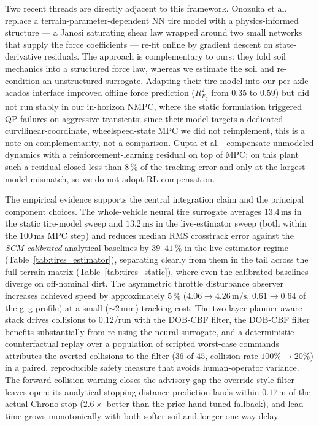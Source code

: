 \documentclass[conference,letterpaper,10pt]{IEEEtran}
\begin{document}
Two recent threads are directly adjacent to this framework.
Onozuka et al.~\cite{Onozuka25} replace a terrain-parameter-dependent NN
tire model with a physics-informed structure --- a Janosi saturating
shear law wrapped around two small networks that supply the force
coefficients --- re-fit online by gradient descent on state-derivative
residuals. The approach is complementary to ours: they fold soil
mechanics into a structured force law, whereas we estimate the soil and
re-condition an unstructured surrogate. Adapting their tire model into
our per-axle acados interface improved offline force prediction
($R^2_{F_y}$ from $0.35$ to $0.59$) but did not run stably in our
in-horizon NMPC, where the static formulation triggered QP failures on
aggressive transients; since their model targets a dedicated
curvilinear-coordinate, wheelspeed-state MPC we did not reimplement, this
is a note on complementarity, not a comparison. Gupta
et al.~\cite{Gupta24} compensate unmodeled dynamics with a
reinforcement-learning residual on top of MPC; on this plant such a
residual closed less than $8\,\%$ of the tracking error and only at the
largest model mismatch, so we do not adopt RL compensation.

The empirical evidence supports the central integration claim and the principal
component choices. The
whole-vehicle neural tire surrogate averages
$13.4\,\mathrm{ms}$ in the static tire-model sweep and
$13.2\,\mathrm{ms}$ in the live-estimator sweep (both within the
$100\,\mathrm{ms}$ MPC step) and reduces median RMS crosstrack error against the
\emph{SCM-calibrated} analytical baselines by $39$--$41\,\%$ in the
live-estimator regime (Table~\ref{tab:tires_estimator}), separating
clearly from them in the tail across the full terrain matrix
(Table~\ref{tab:tires_static}), where even the calibrated baselines
diverge on off-nominal dirt. The asymmetric
throttle disturbance observer increases achieved speed by approximately
$5\,\%$ ($4.06\!\to\!4.26\,\mathrm{m/s}$, $0.61\!\to\!0.64$ of the
g--g profile) at a small (${\sim}2\,\mathrm{mm}$) tracking
cost. The two-layer planner-aware stack drives collisions to $0.12$/run with
the DOB-CBF filter, the DOB-CBF filter benefits substantially from
re-using the neural surrogate, and a deterministic counterfactual replay over a
population of scripted worst-case commands attributes the averted collisions to
the filter ($36$ of $45$, collision rate $100\%\!\to\!20\%$) in a paired,
reproducible safety measure that avoids human-operator variance. The forward
collision warning closes the advisory gap the override-style filter
leaves open: its analytical stopping-distance prediction lands within
$0.17\,\mathrm{m}$ of the actual Chrono stop ($2.6\times$ better than
the prior hand-tuned fallback), and lead time grows monotonically
with both softer soil and longer one-way delay.
\end{document}
